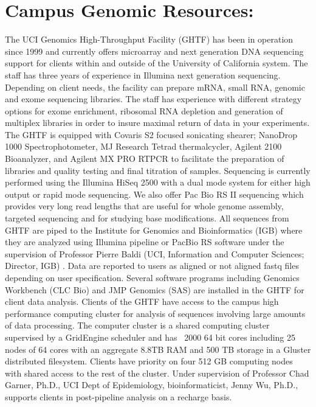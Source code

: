 \section{Campus Genomic Resources:} The UCI Genomics High-Throughput Facility (GHTF) has been in operation since 1999 and currently offers microarray and next generation DNA sequencing support for clients within and outside of the University of California system.  The staff has three years of experience in Illumina next generation sequencing.  Depending on client needs, the facility can prepare mRNA, small RNA, genomic and exome sequencing libraries. The staff has experience with different strategy options for exome enrichment, ribosomal RNA depletion and generation of multiplex libraries in order to insure maximal return of data in your experiments. The GHTF is equipped with Covaris S2 focused sonicating shearer; NanoDrop 1000 Spectrophotometer, MJ Research Tetrad thermalcycler, Agilent 2100 Bioanalyzer, and Agilent MX PRO RTPCR to facilitate the preparation of libraries and quality testing and final titration of samples.   Sequencing is currently performed using the Illumina HiSeq 2500 with a dual mode system for either high output or rapid mode sequencing. We also offer  Pac Bio RS II sequencing which provides very long read lengths that are useful for whole genome assembly, targeted sequencing and for studying base modifications. All sequences from GHTF are piped to the Institute for Genomics and Bioinformatics (IGB) where they are analyzed using Illumina pipeline or PacBio RS software under the supervision of Professor Pierre Baldi (UCI, Information and Computer Sciences; Director, IGB) .  Data are reported to users as aligned or not aligned fastq files depending on user specification.   Several software programs including Genomics Workbench (CLC Bio) and JMP Genomics (SAS) are installed in the GHTF for client data analysis.  Clients of the GHTF have access to the campus high performance computing cluster for analysis of sequences involving large amounts of data processing. The computer cluster is a shared computing cluster supervised by a GridEngine scheduler and has ~2000 64 bit cores including 25 nodes of 64 cores with an aggregate 8.8TB RAM and 500 TB storage in a Gluster distributed filesystem. Clients have priority on four 512 GB computing nodes with shared access to the rest of the cluster.   Under supervision of Professor Chad Garner, Ph.D., UCI Dept of Epidemiology, bioinformaticist, Jenny Wu, Ph.D., supports clients in post-pipeline analysis on a recharge basis.